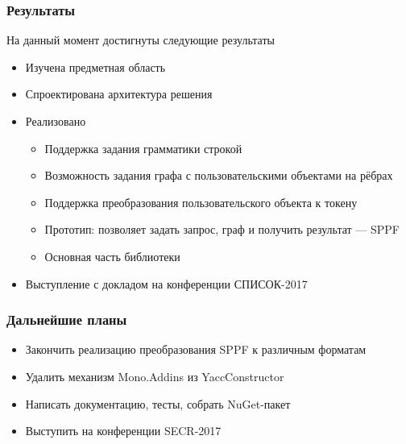 \documentclass{beamer}
\begin{document}
\begin{frame}
  \transwipe[direction=90]
  \frametitle{Результаты}
  На данный момент достигнуты следующие результаты
  \begin{itemize}
    \item Изучена предметная область
    \item Спроектирована архитектура решения
    \item Реализовано
    \begin{itemize}
        \item Поддержка задания грамматики строкой
        \item Возможность задания графа с пользовательскими объектами на рёбрах
        \item Поддержка преобразования пользовательского объекта к токену
        \item Прототип: позволяет задать запрос, граф и получить результат --- SPPF
        \item Основная часть библиотеки
    \end{itemize}
    \item Выступление с докладом на конференции СПИСОК-2017
  \end{itemize}
\end{frame}

\begin{frame}
  \transwipe[direction=90]
  \frametitle{Дальнейшие планы}
  \begin{itemize}
    \item Закончить реализацию преобразования SPPF к различным форматам
    \item Удалить механизм Mono.Addins из YaccConstructor
    \item Написать документацию, тесты, собрать NuGet-пакет
    \item Выступить на конференции SECR-2017
  \end{itemize}
\end{frame}
\end{document}
